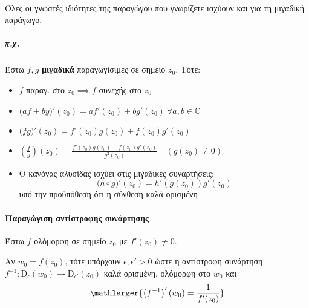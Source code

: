 \documentclass[12pt,a4paper,notitlepage,fleqn]{article}
\begin{document}
    \paragraph{}
    Όλες οι γνωστές ιδιότητες της παραγώγου που γνωρίζετε ισχύουν και για τη
    μιγαδική παράγωγο.
    \subparagraph{π.χ.}
    Έστω \( f,g \) \textbf{μιγαδικά} παραγωγίσιμες σε σημείο \( z_0 \). Τότε:
    \begin{itemize}
       	\item \( f \) παραγ. στο \( z_0 \implies f \) συνεχής στο \( z_0 \)
       	\item \( \big(af\pm by\big)'(z_0)=
       	af'(z_0)+bg'(z_0)\ \forall a,b\in\mathbb C  \)
       	\item \( \big(fg\big)'(z_0) = f'(z_0)g(z_0)+f(z_0)g'(z_0) \)
       	\item \(  \left(
       	\frac{f}{g} \right)(z_0)= \frac{f'(z_0)g(z_0)-f(z_0)g'(z_0)}{g^2(z_0)}
       	\quad \left(g(z_0)\neq0\right)
       	\)
       	\item Ο κανόνας αλυσίδας ισχύει στις μιγαδικές συναρτήσεις:
       	\[
       	\big( h\circ g \big)'(z_0)=h'\left( g(z_0) \right)g'(z_0)
       	\]
       	υπό την προϋπόθεση ότι η σύνθεση καλά ορισμένη
    \end{itemize}

    \paragraph{Παραγώγιση αντίστροφης συνάρτησης} %
    Έστω \( f \) ολόμορφη σε σημείο \( z_0 \) με \( f'(z_0)\neq 0 \).

    Αν \( w_0=f(z_0) \), τότε υπάρχουν \( \epsilon,\epsilon' >0 \) ώστε η
    αντίστροφη συνάρτηση \( f^{-1}:\mathrm D_\epsilon(w_0)
    \to\mathrm D_{\epsilon'}(z_0)
    \) καλά ορισμένη, ολόμορφη στο \( w_0 \) και
    \[
    \mathlarger{
       	\left( f^{-1} \right)'(w_0) = \frac{1}{f'(z_0)}
    }
    \]
\end{document}
